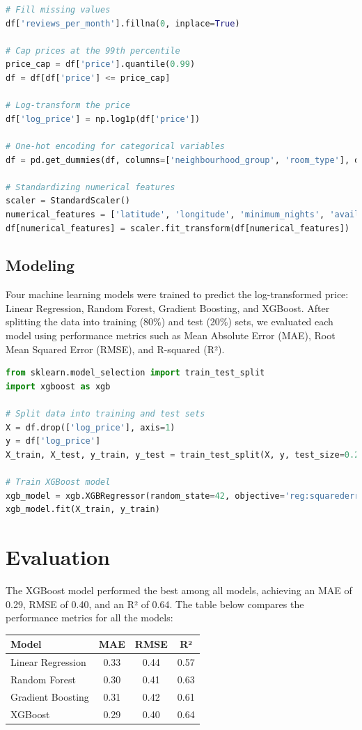 \documentclass{article}
\begin{document}
\begin{lstlisting}[language=Python]
# Fill missing values
df['reviews_per_month'].fillna(0, inplace=True)

# Cap prices at the 99th percentile
price_cap = df['price'].quantile(0.99)
df = df[df['price'] <= price_cap]

# Log-transform the price
df['log_price'] = np.log1p(df['price'])

# One-hot encoding for categorical variables
df = pd.get_dummies(df, columns=['neighbourhood_group', 'room_type'], drop_first=True)

# Standardizing numerical features
scaler = StandardScaler()
numerical_features = ['latitude', 'longitude', 'minimum_nights', 'availability_365']
df[numerical_features] = scaler.fit_transform(df[numerical_features])
\end{lstlisting}

\subsection{Modeling}
Four machine learning models were trained to predict the log-transformed price: Linear Regression, Random Forest, Gradient Boosting, and XGBoost. After splitting the data into training (80\%) and test (20\%) sets, we evaluated each model using performance metrics such as Mean Absolute Error (MAE), Root Mean Squared Error (RMSE), and R-squared (R²).

\begin{lstlisting}[language=Python]
from sklearn.model_selection import train_test_split
import xgboost as xgb

# Split data into training and test sets
X = df.drop(['log_price'], axis=1)
y = df['log_price']
X_train, X_test, y_train, y_test = train_test_split(X, y, test_size=0.2, random_state=42)

# Train XGBoost model
xgb_model = xgb.XGBRegressor(random_state=42, objective='reg:squarederror')
xgb_model.fit(X_train, y_train)
\end{lstlisting}

\section{Evaluation}
The XGBoost model performed the best among all models, achieving an MAE of 0.29, RMSE of 0.40, and an R² of 0.64. The table below compares the performance metrics for all the models:

\begin{tabular}{lccc}
\hline
Model & MAE & RMSE & R² \\
\hline
Linear Regression & 0.33 & 0.44 & 0.57 \\
Random Forest & 0.30 & 0.41 & 0.63 \\
Gradient Boosting & 0.31 & 0.42 & 0.61 \\
XGBoost & 0.29 & 0.40 & 0.64 \\
\hline
\end{tabular}
\end{document}

